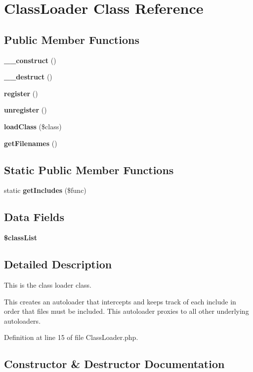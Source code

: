 \section{Class\+Loader Class Reference}
\label{class_class_preloader_1_1_class_loader}
\subsection*{Public Member Functions}
\begin{DoxyCompactItemize}
\item 
{\bf \+\_\+\+\_\+construct} ()
\item 
{\bf \+\_\+\+\_\+destruct} ()
\item 
{\bf register} ()
\item 
{\bf unregister} ()
\item 
{\bf load\+Class} (\$class)
\item 
{\bf get\+Filenames} ()
\end{DoxyCompactItemize}
\subsection*{Static Public Member Functions}
\begin{DoxyCompactItemize}
\item 
static {\bf get\+Includes} (\$func)
\end{DoxyCompactItemize}
\subsection*{Data Fields}
\begin{DoxyCompactItemize}
\item 
{\bf \$class\+List}
\end{DoxyCompactItemize}


\subsection{Detailed Description}
This is the class loader class.

This creates an autoloader that intercepts and keeps track of each include in order that files must be included. This autoloader proxies to all other underlying autoloaders. 

Definition at line 15 of file Class\+Loader.\+php.



\subsection{Constructor \& Destructor Documentation}
